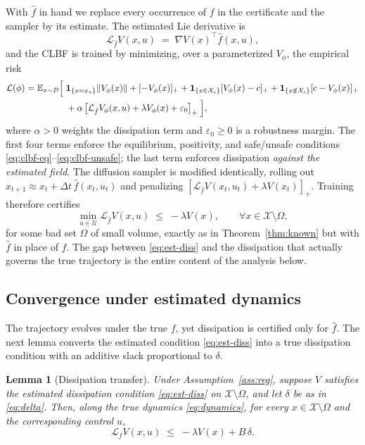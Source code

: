 \documentclass{article}
\newcommand{\E}{\mathbb{E}}           %
\newcommand{\ind}{\mathbf{1}}         %
\newcommand{\eps}{\varepsilon}
\newcommand{\Xs}{\mathcal{X}_s}
\newcommand{\Lie}[2]{\mathcal{L}_{#1} #2}
\newcommand{\hf}{\hat{f}}
\newtheorem{lemma}[theorem]{Lemma}
\begin{document}
With $\hf$ in hand we replace every occurrence of $f$ in the certificate and the
sampler by its estimate. The estimated Lie derivative is
\[
    \Lie{\hf}{V}(x,u)\;=\;\nabla V(x)^\top \hf(x,u),
\]
and the CLBF is trained by minimizing, over a parameterized $V_\phi$, the empirical
risk
\[
\begin{aligned}
    \mathcal{L}(\phi)=\E_{x\sim\mathcal{D}}\Bigl[\;
    &\ind_{\{x=x_\star\}}\|V_\phi(x)\|
    +[-V_\phi(x)]_+
    +\ind_{\{x\in\Xs\}}[V_\phi(x)-c]_+
    +\ind_{\{x\notin\Xs\}}[c-V_\phi(x)]_+\\
    &+\alpha\,\bigl[\Lie{\hf}{V_\phi}(x,u)+\lambda V_\phi(x)+\eps_0\bigr]_+
    \;\Bigr],
\end{aligned}
\]
where $\alpha>0$ weights the dissipation term and $\eps_0\ge 0$ is a robustness
margin. The first four terms enforce the equilibrium, positivity, and
safe/unsafe conditions \eqref{eq:clbf-eq}--\eqref{eq:clbf-unsafe}; the last term
enforces dissipation \emph{against the estimated field}. The diffusion sampler is
modified identically, rolling out $x_{t+1}\approx x_t+\Delta t\,\hf(x_t,u_t)$ and
penalizing $[\Lie{\hf}{V}(x_t,u_t)+\lambda V(x_t)]_+$. Training therefore certifies
\begin{equation}
\label{eq:est-diss}
    \min_{u\in\mathcal{U}}\Lie{\hf}{V}(x,u)\;\le\;-\lambda V(x),
    \qquad \forall x\in\mathcal{X}\setminus\Omega,
\end{equation}
for some bad set $\Omega$ of small volume, exactly as in
Theorem~\ref{thm:known} but with $\hf$ in place of $f$. The gap between
\eqref{eq:est-diss} and the dissipation that actually governs the true trajectory
is the entire content of the analysis below.

\subsection{Convergence under estimated dynamics}

The trajectory evolves under the true $f$, yet dissipation is certified only for
$\hf$. The next lemma converts the estimated condition \eqref{eq:est-diss} into a
true dissipation condition with an additive slack proportional to $\delta$.

\begin{lemma}[Dissipation transfer]
\label{lem:transfer}
Under Assumption~\ref{ass:reg}, suppose $V$ satisfies the estimated dissipation
condition \eqref{eq:est-diss} on $\mathcal{X}\setminus\Omega$, and let
$\delta$ be as in \eqref{eq:delta}. Then, along the true dynamics
\eqref{eq:dynamics}, for every $x\in\mathcal{X}\setminus\Omega$ and the
corresponding control $u$,
\[
    \Lie{f}{V}(x,u)\;\le\;-\lambda V(x) + B\,\delta.
\]
\end{lemma}
\end{document}
